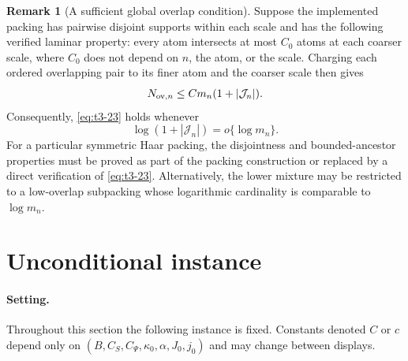 \documentclass[11pt]{article}
\theoremstyle{definition}
\newtheorem{remark}[definition]{Remark}
\newcommand{\1}{\mathbf 1}\newcommand{\op}{\operatorname}
\begin{document}
\begin{remark}[A sufficient global overlap condition]
Suppose the implemented packing has pairwise disjoint supports within
each scale and has the following verified laminar property: every atom
intersects at most \(C_0\) atoms at each coarser scale, where \(C_0\)
does not depend on \(n\), the atom, or the scale.  Charging each
ordered overlapping pair to its finer atom and the coarser scale then
gives
\[
N_{{\rm ov},n}
\le
C m_n(1+|\mathcal J_n|).
\]
Consequently, \eqref{eq:t3-23} holds whenever
\[
\log(1+|\mathcal J_n|)
=
o\{\log m_n\}.
\]
For a particular symmetric Haar packing, the disjointness and
bounded-ancestor properties must be proved as part of the packing
construction or replaced by a direct verification of
\eqref{eq:t3-23}.  Alternatively, the lower mixture may be restricted
to a low-overlap subpacking whose logarithmic cardinality is
comparable to \(\log m_n\).
\end{remark}



\section{Unconditional instance}\label{sec:supp-uncond}


\paragraph{Setting.}
Throughout this section the following instance is fixed.  Constants denoted $C$
or $c$ depend only on $(B,C_S,C_\Psi,\kappa_0,\alpha,J_0,j_0)$ and may change
between displays.
\end{document}
